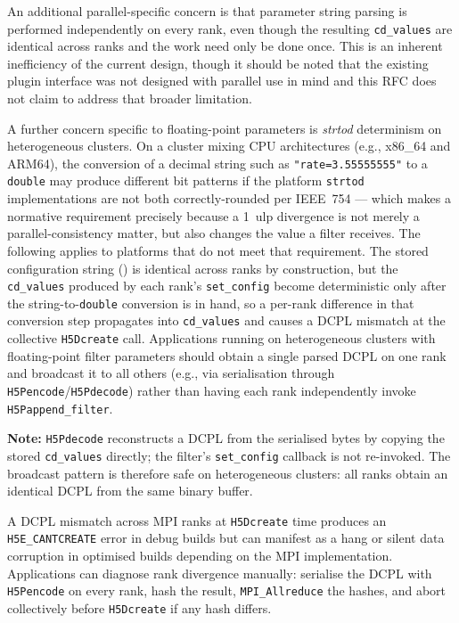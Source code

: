 \documentclass[../RFC-HDFG-2026-001.tex]{subfiles}
\begin{document}
An additional parallel-specific concern is that parameter string parsing is
performed independently on every rank, even though the resulting
\texttt{cd\_values} are identical across ranks and the work need only be done
once.  This is an inherent inefficiency of the current design, though it
should be noted that the existing plugin interface was not designed with
parallel use in mind and this RFC does not claim to address that broader
limitation.

A further concern specific to floating-point parameters is
\textit{strtod} determinism on heterogeneous clusters.  On a cluster mixing
CPU architectures (e.g., x86\_64 and ARM64), the conversion of a decimal
string such as \texttt{"rate=3.55555555"} to a \texttt{double} may produce
different bit patterns if the platform \texttt{strtod} implementations are
not both correctly-rounded per IEEE~754 --- which
 makes a normative requirement precisely
because a 1~ulp divergence is not merely a parallel-consistency matter, but
also changes the value a filter receives.  The following applies to
platforms that do not meet that requirement.  The stored configuration string
() is identical across ranks by construction, but
the \texttt{cd\_values} produced by each rank's \texttt{set\_config} become
deterministic only after the string-to-\texttt{double} conversion is in
hand, so a per-rank difference in that conversion step propagates into
\texttt{cd\_values} and causes a DCPL mismatch at the collective
\texttt{H5Dcreate} call.  Applications running on heterogeneous clusters
with floating-point filter parameters should obtain a single parsed DCPL on
one rank and broadcast it to all others (e.g., via serialisation through
\texttt{H5Pencode}/\texttt{H5Pdecode}) rather than having each rank
independently invoke \texttt{H5Pappend\_filter}.

\textbf{Note:} \texttt{H5Pdecode} reconstructs a DCPL from the serialised
bytes by copying the stored \texttt{cd\_values} directly; the filter's
\texttt{set\_config} callback is not re-invoked.  The broadcast pattern is
therefore safe on heterogeneous clusters: all ranks obtain an identical
DCPL from the same binary buffer.

A DCPL mismatch across MPI ranks at \texttt{H5Dcreate} time produces an
\texttt{H5E\_CANTCREATE} error in debug builds but can manifest as a hang
or silent data corruption in optimised builds depending on the MPI
implementation.  Applications can diagnose rank divergence manually:
serialise the DCPL with \texttt{H5Pencode} on every rank, hash the result,
\texttt{MPI\_Allreduce} the hashes, and abort collectively before
\texttt{H5Dcreate} if any hash differs.
\end{document}
